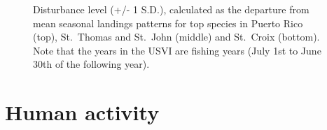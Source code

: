 \documentclass[
  letterpaper,
  oneside,
  open=any]{scrbook}
\begin{document}
\begin{figure}


\caption{\label{fig-dist}Disturbance level (+/- 1 S.D.), calculated as
the departure from mean seasonal landings patterns for top species in
Puerto Rico (top), St.~Thomas and St.~John (middle) and St.~Croix
(bottom). Note that the years in the USVI are fishing years (July 1st to
June 30th of the following year).}

\end{figure}%

\section{Human activity}\label{human-activity}
\end{document}
